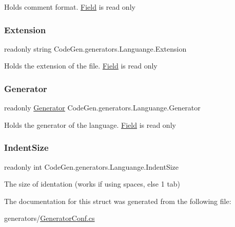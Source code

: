 Holds comment format. \mbox{\hyperlink{classCodeGen_1_1generators_1_1Field}{Field}} is read only 

\mbox{\label{structCodeGen_1_1generators_1_1Languange_af00eae192536b05d637d0b81954202c7}} 
\subsubsection{\texorpdfstring{Extension}{Extension}}
{\footnotesize\ttfamily readonly string Code\+Gen.\+generators.\+Languange.\+Extension}



Holds the extension of the file. \mbox{\hyperlink{classCodeGen_1_1generators_1_1Field}{Field}} is read only 

\mbox{\label{structCodeGen_1_1generators_1_1Languange_a25fb0a47247497581d2d0560d0db66d8}} 
\subsubsection{\texorpdfstring{Generator}{Generator}}
{\footnotesize\ttfamily readonly \mbox{\hyperlink{classCodeGen_1_1generators_1_1Generator}{Generator}} Code\+Gen.\+generators.\+Languange.\+Generator}



Holds the generator of the language. \mbox{\hyperlink{classCodeGen_1_1generators_1_1Field}{Field}} is read only 

\mbox{\label{structCodeGen_1_1generators_1_1Languange_a3337b97358faf06c1e633e80f71cf2b4}} 
\subsubsection{\texorpdfstring{Indent\+Size}{IndentSize}}
{\footnotesize\ttfamily readonly int Code\+Gen.\+generators.\+Languange.\+Indent\+Size}



The size of identation (works if using spaces, else 1 tab) 



The documentation for this struct was generated from the following file\+:\begin{DoxyCompactItemize}
\item 
generators/\mbox{\hyperlink{GeneratorConf_8cs}{Generator\+Conf.\+cs}}\end{DoxyCompactItemize}

